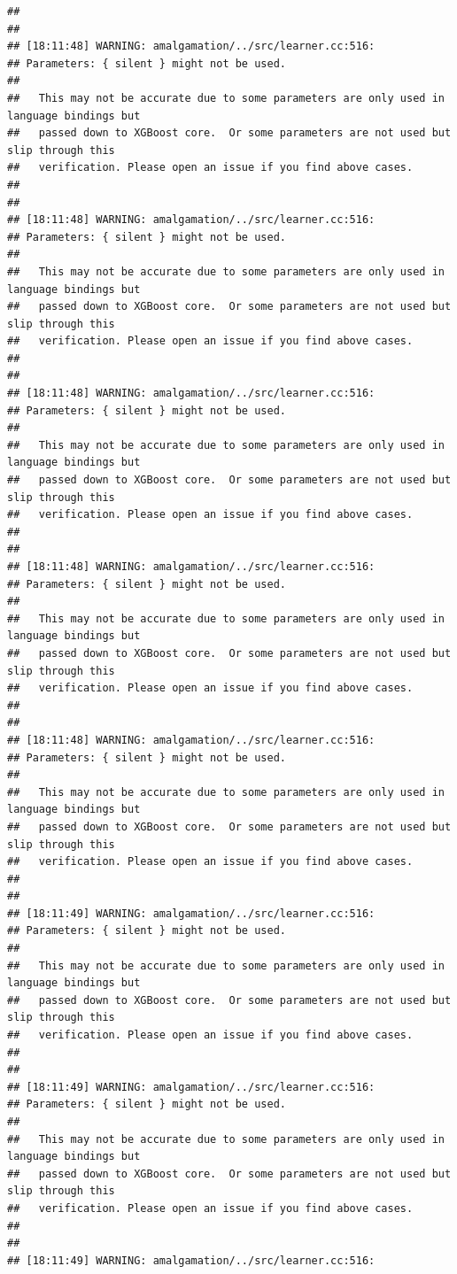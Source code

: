 \documentclass[AMS,STIX2COL]{WileyNJD-v2}\usepackage[]{graphicx}\usepackage[]{color}
\makeatletter
\newenvironment{kframe}{%
 \def\at@end@of@kframe{}%
 \ifinner\ifhmode%
  \def\at@end@of@kframe{\end{minipage}}%
  \begin{minipage}{\columnwidth}%
 \fi\fi%
 \def\FrameCommand##1{\hskip\@totalleftmargin \hskip-\fboxsep
 \colorbox{shadecolor}{##1}\hskip-\fboxsep
     \hskip-\linewidth \hskip-\@totalleftmargin \hskip\columnwidth}%
 \MakeFramed {\advance\hsize-\width
   \@totalleftmargin\z@ \linewidth\hsize
   \@setminipage}}%
 {\par\unskip\endMakeFramed%
 \at@end@of@kframe}
\newenvironment{knitrout}{}{} %
\makeatother
\begin{document}
\begin{knitrout}
\begin{kframe}
\begin{verbatim}
## 
## 
## [18:11:48] WARNING: amalgamation/../src/learner.cc:516: 
## Parameters: { silent } might not be used.
## 
##   This may not be accurate due to some parameters are only used in language bindings but
##   passed down to XGBoost core.  Or some parameters are not used but slip through this
##   verification. Please open an issue if you find above cases.
## 
## 
## [18:11:48] WARNING: amalgamation/../src/learner.cc:516: 
## Parameters: { silent } might not be used.
## 
##   This may not be accurate due to some parameters are only used in language bindings but
##   passed down to XGBoost core.  Or some parameters are not used but slip through this
##   verification. Please open an issue if you find above cases.
## 
## 
## [18:11:48] WARNING: amalgamation/../src/learner.cc:516: 
## Parameters: { silent } might not be used.
## 
##   This may not be accurate due to some parameters are only used in language bindings but
##   passed down to XGBoost core.  Or some parameters are not used but slip through this
##   verification. Please open an issue if you find above cases.
## 
## 
## [18:11:48] WARNING: amalgamation/../src/learner.cc:516: 
## Parameters: { silent } might not be used.
## 
##   This may not be accurate due to some parameters are only used in language bindings but
##   passed down to XGBoost core.  Or some parameters are not used but slip through this
##   verification. Please open an issue if you find above cases.
## 
## 
## [18:11:48] WARNING: amalgamation/../src/learner.cc:516: 
## Parameters: { silent } might not be used.
## 
##   This may not be accurate due to some parameters are only used in language bindings but
##   passed down to XGBoost core.  Or some parameters are not used but slip through this
##   verification. Please open an issue if you find above cases.
## 
## 
## [18:11:49] WARNING: amalgamation/../src/learner.cc:516: 
## Parameters: { silent } might not be used.
## 
##   This may not be accurate due to some parameters are only used in language bindings but
##   passed down to XGBoost core.  Or some parameters are not used but slip through this
##   verification. Please open an issue if you find above cases.
## 
## 
## [18:11:49] WARNING: amalgamation/../src/learner.cc:516: 
## Parameters: { silent } might not be used.
## 
##   This may not be accurate due to some parameters are only used in language bindings but
##   passed down to XGBoost core.  Or some parameters are not used but slip through this
##   verification. Please open an issue if you find above cases.
## 
## 
## [18:11:49] WARNING: amalgamation/../src/learner.cc:516: 

\end{verbatim}
\end{kframe}
\end{knitrout}
\end{document}
